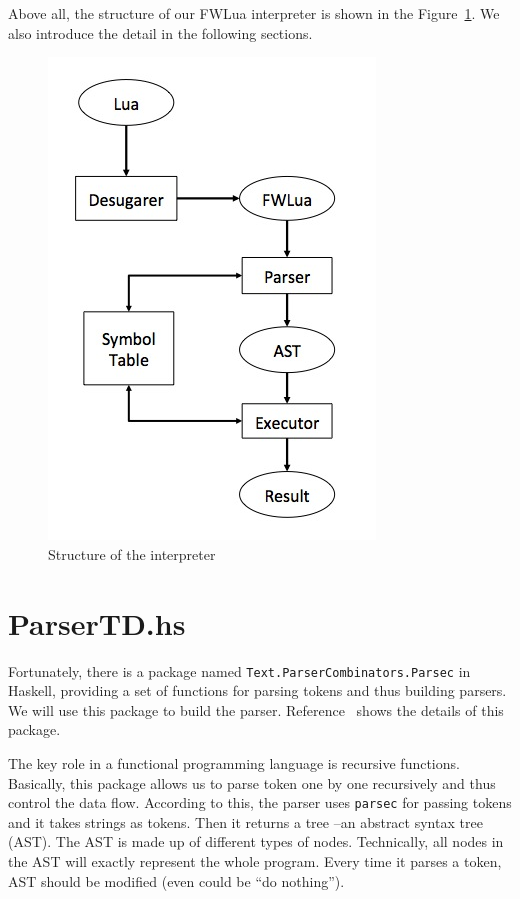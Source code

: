 Above all, the structure of our FWLua interpreter is shown in the Figure~\ref {fig:structure}. We also introduce the detail in the following sections. 

\begin{figure}
\centering
\caption{Structure of the interpreter}
\label{fig:structure}
\includegraphics[scale = 0.9]{Interpreter}
\end{figure}

\section{ParserTD.hs}
Fortunately, there is a package named {\tt Text.ParserCombinators.Parsec} in Haskell, providing a set of functions for parsing tokens and thus building parsers. We will use this package to build the parser. Reference~\cite{IHAS} shows the details of this package.

The key role in a functional programming language is recursive functions. Basically, this package allows us to parse token one by one recursively and thus control the data flow. According to this, the parser uses {\tt parsec} for passing tokens and it takes strings as tokens. Then it returns a tree --an abstract syntax tree (AST). The AST is made up of different types of nodes. Technically, all nodes in the AST will exactly represent the whole program. Every time it parses a token, AST should be modified (even could be ``do nothing'').

